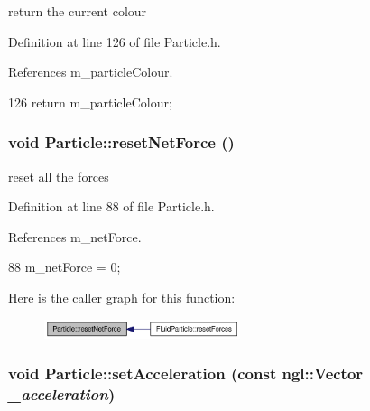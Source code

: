 return the current colour 



Definition at line 126 of file Particle.h.



References m\_\-particleColour.




\begin{DoxyCode}
126 { return m_particleColour; }
\end{DoxyCode}


\hypertarget{class_particle_ac8899fda0ce03b91b12421e4867b7158}{
\subsubsection[{resetNetForce}]{\setlength{\rightskip}{0pt plus 5cm}void Particle::resetNetForce ()}}
\label{class_particle_ac8899fda0ce03b91b12421e4867b7158}


reset all the forces 



Definition at line 88 of file Particle.h.



References m\_\-netForce.




\begin{DoxyCode}
88 { m_netForce = 0; }
\end{DoxyCode}




Here is the caller graph for this function:\nopagebreak
\begin{figure}[H]
\begin{center}
\leavevmode
\includegraphics[width=163pt]{class_particle_ac8899fda0ce03b91b12421e4867b7158_icgraph}
\end{center}
\end{figure}


\hypertarget{class_particle_a41bb1603300645f52e875e2b71bfb98c}{
\subsubsection[{setAcceleration}]{\setlength{\rightskip}{0pt plus 5cm}void Particle::setAcceleration (const ngl::Vector {\em \_\-acceleration})}}
\label{class_particle_a41bb1603300645f52e875e2b71bfb98c}


